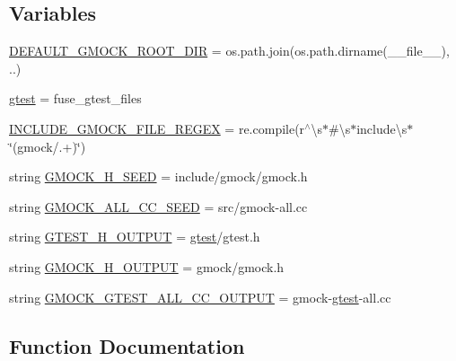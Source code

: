 \subsection*{Variables}
\begin{DoxyCompactItemize}
\item 
\hyperlink{namespacefuse__gmock__files_a900b64b34e20c7430b72252192a3c7ed}{D\+E\+F\+A\+U\+L\+T\+\_\+\+G\+M\+O\+C\+K\+\_\+\+R\+O\+O\+T\+\_\+\+D\+IR} = os.\+path.\+join(os.\+path.\+dirname(\+\_\+\+\_\+file\+\_\+\+\_\+), \textquotesingle{}..\textquotesingle{})
\item 
\hyperlink{namespacefuse__gmock__files_a3fb36dbe8d361f9ecc54e1aa4b94b068}{gtest} = fuse\+\_\+gtest\+\_\+files
\item 
\hyperlink{namespacefuse__gmock__files_aeb4457451f878d6bc8a42f7ff3e5f6cf}{I\+N\+C\+L\+U\+D\+E\+\_\+\+G\+M\+O\+C\+K\+\_\+\+F\+I\+L\+E\+\_\+\+R\+E\+G\+EX} = re.\+compile(r\textquotesingle{}$^\wedge$\textbackslash{}s$\ast$\#\textbackslash{}s$\ast$include\textbackslash{}s$\ast$\char`\"{}(gmock/.+)\char`\"{}\textquotesingle{})
\item 
string \hyperlink{namespacefuse__gmock__files_aa31b816a9048fb3fa9d482eeac69c139}{G\+M\+O\+C\+K\+\_\+\+H\+\_\+\+S\+E\+ED} = \textquotesingle{}include/gmock/gmock.\+h\textquotesingle{}
\item 
string \hyperlink{namespacefuse__gmock__files_a518e1f3cc3f184747e6ed3f2d0233c99}{G\+M\+O\+C\+K\+\_\+\+A\+L\+L\+\_\+\+C\+C\+\_\+\+S\+E\+ED} = \textquotesingle{}src/gmock-\/all.\+cc\textquotesingle{}
\item 
string \hyperlink{namespacefuse__gmock__files_a385c31d8542b0a2e4b7f46cb2a32d7da}{G\+T\+E\+S\+T\+\_\+\+H\+\_\+\+O\+U\+T\+P\+UT} = \textquotesingle{}\hyperlink{namespacefuse__gmock__files_a3fb36dbe8d361f9ecc54e1aa4b94b068}{gtest}/gtest.\+h\textquotesingle{}
\item 
string \hyperlink{namespacefuse__gmock__files_aba0664abeb60f34cfdf59e8475a465d0}{G\+M\+O\+C\+K\+\_\+\+H\+\_\+\+O\+U\+T\+P\+UT} = \textquotesingle{}gmock/gmock.\+h\textquotesingle{}
\item 
string \hyperlink{namespacefuse__gmock__files_a9759f3f6c404e3292c26c9317792e846}{G\+M\+O\+C\+K\+\_\+\+G\+T\+E\+S\+T\+\_\+\+A\+L\+L\+\_\+\+C\+C\+\_\+\+O\+U\+T\+P\+UT} = \textquotesingle{}gmock-\/\hyperlink{namespacefuse__gmock__files_a3fb36dbe8d361f9ecc54e1aa4b94b068}{gtest}-\/all.\+cc\textquotesingle{}
\end{DoxyCompactItemize}


\subsection{Function Documentation}
